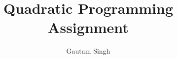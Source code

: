 \documentclass[journal,12pt,twocolumn]{IEEEtran}
\DeclareMathOperator*{\Res}{Res}
\begin{document}
\newtheorem{theorem}{Theorem}[section]
\newtheorem{problem}{Problem}
\newtheorem{proposition}{Proposition}[section]
\newtheorem{lemma}{Lemma}[section]
\newtheorem{corollary}[theorem]{Corollary}
\newtheorem{example}{Example}[section]
\newtheorem{definition}[problem]{Definition}
\newcommand{\BEQA}{\begin{eqnarray}}
\newcommand{\EEQA}{\end{eqnarray}}
\newcommand{\define}{\stackrel{\triangle}{=}}

\providecommand{\mbf}{\mathbf}
\providecommand{\pr}[1]{\ensuremath{\Pr\left(#1\right)}}
\providecommand{\tr}[1]{\ensuremath{\textrm{tr}\left(#1\right)}}
\providecommand{\qfunc}[1]{\ensuremath{Q\left(#1\right)}}
\providecommand{\sbrak}[1]{\ensuremath{{}\left[#1\right]}}
\providecommand{\lsbrak}[1]{\ensuremath{{}\left[#1\right.}}
\providecommand{\rsbrak}[1]{\ensuremath{{}\left.#1\right]}}
\providecommand{\brak}[1]{\ensuremath{\left(#1\right)}}
\providecommand{\lbrak}[1]{\ensuremath{\left(#1\right.}}
\providecommand{\rbrak}[1]{\ensuremath{\left.#1\right)}}
\providecommand{\cbrak}[1]{\ensuremath{\left\{#1\right\}}}
\providecommand{\lcbrak}[1]{\ensuremath{\left\{#1\right.}}
\providecommand{\rcbrak}[1]{\ensuremath{\left.#1\right\}}}
\theoremstyle{remark}
\newtheorem{rem}{Remark}
\newcommand{\sgn}{\mathop{\mathrm{sgn}}}
\providecommand{\abs}[1]{\left\vert#1\right\vert}
\providecommand{\res}[1]{\Res\displaylimits_{#1}} 
\providecommand{\norm}[1]{\left\lVert#1\right\rVert}
\providecommand{\mtx}[1]{\mathbf{#1}}
\providecommand{\mean}[1]{E\left[ #1 \right]}
\providecommand{\fourier}{\overset{\mathcal{F}}{ \rightleftharpoons}}
\providecommand{\system}[1]{\overset{\mathcal{#1}}{ \longleftrightarrow}}
\newcommand{\solution}{\noindent \textbf{Solution: }}
\newcommand{\cosec}{\,\text{cosec}\,}
\providecommand{\dec}[2]{\ensuremath{\overset{#1}{\underset{#2}{\gtrless}}}}
\newcommand{\myvec}[1]{\ensuremath{\begin{pmatrix}#1\end{pmatrix}}}
\newcommand{\mydet}[1]{\ensuremath{\begin{vmatrix}#1\end{vmatrix}}}
\let\vec\mathbf
\def\putbox#1#2#3{\makebox[0in][l]{\makebox[#1][l]{}\raisebox{\baselineskip}[0in][0in]{\raisebox{#2}[0in][0in]{#3}}}}
     \def\rightbox#1{\makebox[0in][r]{#1}}
     \def\centbox#1{\makebox[0in]{#1}}
     \def\topbox#1{\raisebox{-\baselineskip}[0in][0in]{#1}}
     \def\midbox#1{\raisebox{-0.5\baselineskip}[0in][0in]{#1}}

\vspace{3cm}
\title{Quadratic Programming Assignment}
\author{Gautam Singh}
\maketitle
\bigskip
\end{document}
